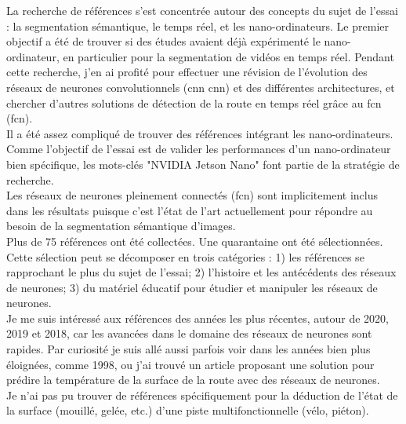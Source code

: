 ﻿\noindent La recherche de références s'est concentrée autour des concepts du sujet de l'essai : la segmentation sémantique, le temps réel, et les nano-ordinateurs. Le premier objectif a été de trouver si des études avaient déjà expérimenté le nano-ordinateur, en particulier pour la segmentation de vidéos en temps réel. Pendant cette recherche, j'en ai profité pour effectuer une révision de l'évolution des réseaux de neurones convolutionnels (\acrshort{cnn} \acrlong{cnn}) et des différentes architectures, et chercher d'autres solutions de détection de la route en temps réel grâce au \acrlong{fcn} (\acrshort{fcn}). 
\vspace{\baselineskip}
\\
\noindent Il a été assez compliqué de trouver des références intégrant les nano-ordinateurs. Comme l'objectif de l'essai est de valider les performances d'un nano-ordinateur bien spécifique, les mots-clés "NVIDIA Jetson Nano" font partie de la stratégie de recherche. 
\vspace{\baselineskip}
\\
\noindent Les réseaux de neurones pleinement connectés (\acrshort{fcn}) sont implicitement inclus dans les résultats puisque c'est l'état de l'art actuellement pour répondre au besoin de la segmentation sémantique d'images.
\vspace{\baselineskip}
\\
\noindent Plus de 75 références ont été collectées. Une quarantaine ont été sélectionnées. Cette sélection peut se décomposer en trois catégories : 1) les références se rapprochant le plus du sujet de l'essai; 2) l'histoire et les antécédents des réseaux de neurones; 3) du matériel éducatif pour étudier et manipuler les réseaux de neurones.
\vspace{\baselineskip}
\\
\noindent Je me suis intéressé aux références des années les plus récentes, autour de 2020, 2019 et 2018, car les avancées dans le domaine des réseaux de neurones sont rapides. Par curiosité je suis allé aussi parfois voir dans les années bien plus éloignées, comme 1998, ou j'ai trouvé un article proposant une solution pour prédire la température de la surface de la route avec des réseaux de neurones.
\vspace{\baselineskip}
\\
\noindent Je n'ai pas pu trouver de références spécifiquement pour la déduction de l'état de la surface (mouillé, gelée, etc.) d'une piste multifonctionnelle (vélo, piéton).